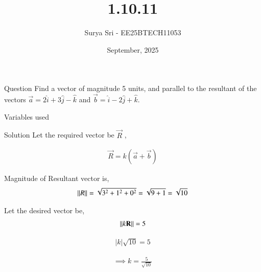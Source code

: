 \documentclass{beamer}
\title 
{1.10.11}
\date{September, 2025}
\author 
{Surya Sri - EE25BTECH11053}
\begin{document}
\frame{\titlepage}
\begin{frame}{Question}
Find a vector of magnitude 5 units, and parallel to the resultant of the vectors $\vec{a} = 2\hat{i} + 3\hat{j} - \hat{k}$ and $\vec{b} = \hat{i} - 2\hat{j} + \hat{k}$.
\end{frame}



\begin{frame}{Variables used}
\begin{table}[H]    
  \centering
  
  \caption{Variables Used}
  \label{tab:1.5.39}
\end{table}

\end{frame}

\begin{frame}{Solution}
Let the required vector be $\vec{R}$ ,

\begin{align}
    \vec{R} = k(\vec{a} + \vec{b})
\end{align}

Magnitude of Resultant vector is,
\begin{align}
\left\lVert R\right\rVert = \sqrt{3^2 + 1^2 + 0^2} = \sqrt{9 + 1} = \sqrt{10}
\end{align}

Let the desired vector be,
\begin{align}
    \left\lVert k\mathbf{R}\right\rVert = 5
\end{align}

\begin{align}
     |{k}|\sqrt{10} = 5 
\end{align}  

\begin{align}
\implies k = \frac{5}{\sqrt{10}}
\end{align}
 
\end{frame}
\end{document}
